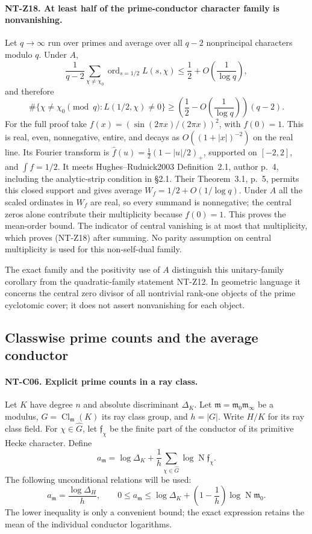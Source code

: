 \documentclass[11pt,a4paper]{article}
\begin{document}
\paragraph{NT-Z18. At least half of the prime-conductor character family is nonvanishing.}
Let $q\to\infty$ run over primes and average over all $q-2$
nonprincipal characters modulo $q$.  Under $A$,
\[
 \frac1{q-2}\sum_{\chi\ne\chi_0}
             \operatorname{ord}_{s=1/2}L(s,\chi)
       \le\frac12+O\left(\frac1{\log q}\right),
\]
and therefore
\[
 \#\{\chi\ne\chi_0\pmod q:L(1/2,\chi)\ne0\}
       \ge\left(\frac12-O\left(\frac1{\log q}\right)\right)(q-2).
\tag{NT-Z18}
\]
For the full proof take
$f(x)=(\sin(2\pi x)/(2\pi x))^2$, with $f(0)=1$.
This is real, even, nonnegative, entire, and decays as
$O((1+|x|)^{-2})$ on the real line.  Its Fourier transform is
$\widehat f(u)=\tfrac12(1-|u|/2)_+$, supported on $[-2,2]$,
and $\int f=1/2$.  It meets Hughes--Rudnick2003 Definition~2.1,
author p.~4, including the analytic-strip condition in \S2.1.
Their Theorem~3.1, p.~5, permits this closed support and gives
average $W_f=1/2+O(1/\log q)$.
Under $A$ all the scaled ordinates in $W_f$ are real, so every
summand is nonnegative; the central zeros alone contribute their
multiplicity because $f(0)=1$.  This proves the mean-order bound.
The indicator of central vanishing is at most that multiplicity,
which proves (NT-Z18) after summing.  No parity assumption on
central multiplicity is used for this non-self-dual family.

The exact family and the positivity use of $A$ distinguish this
unitary-family corollary from the quadratic-family statement
NT-Z12.  In geometric language it concerns the central zero divisor
of all nontrivial rank-one objects of the prime cyclotomic cover;
it does not assert nonvanishing for each object.

\subsection{Classwise prime counts and the average conductor}

\paragraph{NT-C06. Explicit prime counts in a ray class.}
Let $K$ have degree $n$ and absolute discriminant $\Delta_K$.
Let $\mathfrak m=\mathfrak m_0\mathfrak m_\infty$ be a modulus,
$G=\operatorname{Cl}_{\mathfrak m}(K)$ its ray class group, and
$h=|G|$.  Write $H/K$ for its ray class field.  For
$\chi\in\widehat G$, let $\mathfrak f_\chi$ be the finite part
of the conductor of its primitive Hecke character.  Define
\[
 a_{\mathfrak m}=\log\Delta_K+
           \frac1h\sum_{\chi\in\widehat G}
                    \log\operatorname N\mathfrak f_\chi.
\]
The following unconditional relations will be used:
\[
 a_{\mathfrak m}=\frac{\log\Delta_H}{h},\qquad
 0\le a_{\mathfrak m}\le
 \log\Delta_K+\left(1-\frac1h\right)
                     \log\operatorname N\mathfrak m_0.
\tag{NT-ray-conductor}
\]
The lower inequality is only a convenient bound; the exact expression
retains the mean of the individual conductor logarithms.
\end{document}

